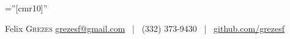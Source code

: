 \documentclass[a4paper,10pt]{article}
\begin{document}

\pagestyle{empty} %

\font\fb=''[cmr10]'' %

\par{
    {\Huge Felix \textsc{Grezes}}
    \hspace*{\fill} {\large \href{mailto:grezesf@gmail.com}{grezesf@gmail.com} ~|~ {\large (332) 373-9430} ~|~ \href{https://github.com/grezesf}{github.com/grezesf} }\\
    \par}




\end{document}
